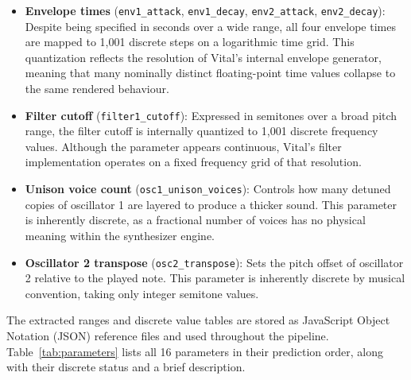 \begin{itemize}
    \item \textbf{Envelope times} (\texttt{env1\_attack}, \texttt{env1\_decay}, \texttt{env2\_attack}, \texttt{env2\_decay}): Despite being specified in seconds over a wide range, all four envelope times are mapped to 1{,}001 discrete steps on a logarithmic time grid. This quantization reflects the resolution of Vital's internal envelope generator, meaning that many nominally distinct floating-point time values collapse to the same rendered behaviour.

    \item \textbf{Filter cutoff} (\texttt{filter1\_cutoff}): Expressed in semitones over a broad pitch range, the filter cutoff is internally quantized to 1{,}001 discrete frequency values. Although the parameter appears continuous, Vital's filter implementation operates on a fixed frequency grid of that resolution.

    \item \textbf{Unison voice count} (\texttt{osc1\_unison\_voices}): Controls how many detuned copies of oscillator 1 are layered to produce a thicker sound. This parameter is inherently discrete, as a fractional number of voices has no physical meaning within the synthesizer engine.

    \item \textbf{Oscillator 2 transpose} (\texttt{osc2\_transpose}): Sets the pitch offset of oscillator 2 relative to the played note. This parameter is inherently discrete by musical convention, taking only integer semitone values.
\end{itemize}

The extracted ranges and discrete value tables are stored as JavaScript Object Notation (JSON) reference files and used throughout the pipeline. Table~\ref{tab:parameters} lists all 16 parameters in their prediction order, along with their discrete status and a brief description.

